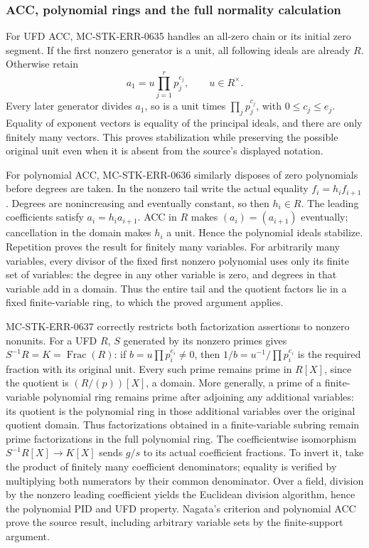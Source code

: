 \subsubsection{ACC, polynomial rings and the full normality calculation}\label{algebra-proof-029-acc-polynomial-rings-and-the-full-normality-calculation}

For UFD ACC, MC-STK-ERR-0635 handles an all-zero chain or its initial zero segment. If the first nonzero generator is a unit, all following ideals are already \(R\). Otherwise retain \[
 a_1=u\prod_{j=1}^r p_j^{e_j},\qquad u\in R^\times.
\] Every later generator divides \(a_1\), so is a unit times \(\prod_jp_j^{c_j}\), with \(0\le c_j\le e_j\). Equality of exponent vectors is equality of the principal ideals, and there are only finitely many vectors. This proves stabilization while preserving the possible original unit even when it is absent from the source's displayed notation.

For polynomial ACC, MC-STK-ERR-0636 similarly disposes of zero polynomials before degrees are taken. In the nonzero tail write the actual equality \(f_i=h_i f_{i+1}\). Degrees are nonincreasing and eventually constant, so then \(h_i\in R\). The leading coefficients satisfy \(a_i=h_i a_{i+1}\). ACC in \(R\) makes \((a_i)=(a_{i+1})\) eventually; cancellation in the domain makes \(h_i\) a unit. Hence the polynomial ideals stabilize. Repetition proves the result for finitely many variables. For arbitrarily many variables, every divisor of the fixed first nonzero polynomial uses only its finite set of variables: the degree in any other variable is zero, and degrees in that variable add in a domain. Thus the entire tail and the quotient factors lie in a fixed finite-variable ring, to which the proved argument applies.

MC-STK-ERR-0637 correctly restricts both factorization assertions to nonzero nonunits. For a UFD \(R\), \(S\) generated by its nonzero primes gives \(S^{-1}R=K=\operatorname{Frac}(R)\): if \(b=u\prod p_i^{e_i}\ne0\), then \(1/b=u^{-1}/\prod p_i^{e_i}\) is the required fraction with its original unit. Every such prime remains prime in \(R[X]\), since the quotient is \((R/(p))[X]\), a domain. More generally, a prime of a finite-variable polynomial ring remains prime after adjoining any additional variables: its quotient is the polynomial ring in those additional variables over the original quotient domain. Thus factorizations obtained in a finite-variable subring remain prime factorizations in the full polynomial ring. The coefficientwise isomorphism \(S^{-1}R[X]\to K[X]\) sends \(g/s\) to its actual coefficient fractions. To invert it, take the product of finitely many coefficient denominators; equality is verified by multiplying both numerators by their common denominator. Over a field, division by the nonzero leading coefficient yields the Euclidean division algorithm, hence the polynomial PID and UFD property. Nagata's criterion and polynomial ACC prove the source result, including arbitrary variable sets by the finite-support argument.

